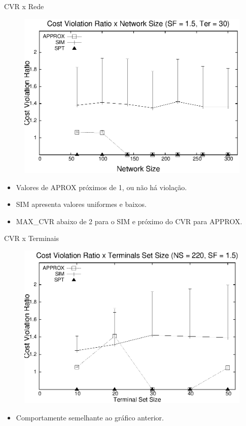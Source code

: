 \documentclass[10pt]{beamer}
\begin{document}
\begin{frame}{CVR x Rede}
\begin{figure}[H]
\centering
\includegraphics[scale=0.60]{imagens/defesa-cvr_rede}
\label{fig:cvr_rede}
\end{figure}
\begin{itemize}
  \item Valores de APROX próximos de 1, ou não há violação.
  \item SIM apresenta valores uniformes e baixos.
  \item MAX\_CVR abaixo de 2 para o SIM e próximo do CVR para APPROX.
\end{itemize}
\end{frame}

\begin{frame}{CVR x Terminais}
\begin{figure}[H]
\centering
\includegraphics[scale=0.60]{imagens/defesa-cvr_terminal}
\label{fig:cvr_terminal}
\end{figure}
\begin{itemize}
  \item Comportamente semelhante ao gráfico anterior.
\end{itemize}
\end{frame}
\end{document}
